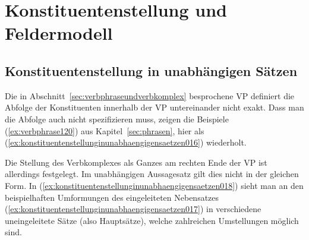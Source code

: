 \Stretch


\Np

\section{Konstituentenstellung und Feldermodell}
\label{sec:konstituentenstellungundfeldermodell}

\subsection{Konstituentenstellung in unabhängigen Sätzen}
\label{sec:konstituentenstellunginunabhaengigensaetzen}

Die in Abschnitt~\ref{sec:verbphraseundverbkomplex} besprochene VP definiert die Abfolge der Konstituenten innerhalb der VP untereinander nicht exakt.
Dass man die Abfolge auch nicht spezifizieren muss, zeigen die Beispiele (\ref{ex:verbphrase120}) aus Kapitel~\ref{sec:phrasen}, hier als (\ref{ex:konstituentenstellunginunabhaengigensaetzen016}) wiederholt.

\begin{exe}
  \ex\label{ex:konstituentenstellunginunabhaengigensaetzen016}
  \begin{xlist}
    \ex{\ThePhrasenExOne}
    \ex{\ThePhrasenExTwo}
  \end{xlist}
\end{exe}

Die Stellung des Verbkomplexes als Ganzes am rechten Ende der VP ist allerdings festgelegt.
Im unabhängigen Aussagesatz gilt dies nicht in der gleichen Form.
In (\ref{ex:konstituentenstellunginunabhaengigensaetzen018}) sieht man an den beispielhaften Umformungen des eingeleiteten Nebensatzes (\ref{ex:konstituentenstellunginunabhaengigensaetzen017}) in verschiedene uneingeleitete Sätze (also Hauptsätze), welche zahlreichen Umstellungen möglich sind.

